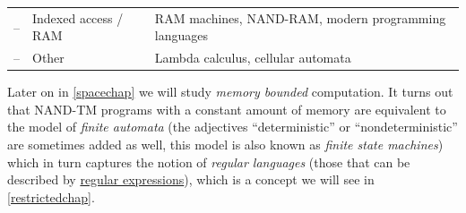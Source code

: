 \begin{longtable}[]{@{}lll@{}}
\begin{minipage}[t]{0.31\columnwidth}\raggedright
--\strut
\end{minipage} & \begin{minipage}[t]{0.27\columnwidth}\raggedright
Indexed access / RAM\strut
\end{minipage} & \begin{minipage}[t]{0.33\columnwidth}\raggedright
RAM machines, NAND-RAM, modern programming languages\strut
\end{minipage}\tabularnewline
\begin{minipage}[t]{0.31\columnwidth}\raggedright
--\strut
\end{minipage} & \begin{minipage}[t]{0.27\columnwidth}\raggedright
Other\strut
\end{minipage} & \begin{minipage}[t]{0.33\columnwidth}\raggedright
Lambda calculus, cellular automata\strut
\end{minipage}\tabularnewline
\bottomrule
\end{longtable}

Later on in \cref{spacechap} we will study \emph{memory bounded}
computation. It turns out that NAND-TM programs with a constant amount
of memory are equivalent to the model of \emph{finite automata} (the
adjectives ``deterministic'' or ``nondeterministic'' are sometimes added
as well, this model is also known as \emph{finite state machines}) which
in turn captures the notion of \emph{regular languages} (those that can
be described by
\href{https://en.wikipedia.org/wiki/Regular_expression}{regular
expressions}), which is a concept we will see in \cref{restrictedchap}.


